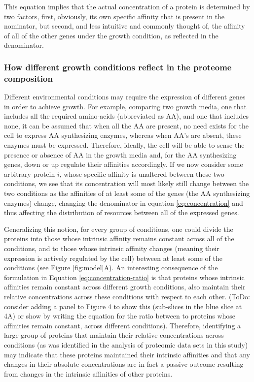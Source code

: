 \documentclass[notitlepage]{article}
\begin{document}
This equation implies that the actual concentration of a protein is determined by two factors, first, obviously, its own specific affinity that is present in the nominator, but second, and less intuitive and commonly thought of, the affinity of all of the other genes under the growth condition, as reflected in the denominator.

\subsubsection{How different growth conditions reflect in the proteome composition}
Different environmental conditions may require the expression of different genes in order to achieve growth.
For example, comparing two growth media, one that includes all the required amino-acids (abbreviated as AA), and one that includes none, it can be assumed that when all the AA are present, no need exists for the cell to express AA synthesizing enzymes, whereas when AA's are absent, these enzymes must be expressed.
Therefore, ideally, the cell will be able to sense the presence or absence of AA in the growth media and, for the AA synthesizing genes, down or up regulate their affinities accordingly.
If we now consider some arbitrary protein $i$, whose specific affinity is unaltered between these two conditions, we see that its concentration will most likely still change between the two conditions as the affinities of at least some of the genes (the AA synthesizing enzymes) change, changing the denominator in equation \ref{eq:concentration} and thus affecting the distribution of resources between all of the expressed genes.

Generalizing this notion, for every group of conditions, one could divide the proteins into those whose intrinsic affinity remains constant across all of the conditions, and to those whose intrinsic affinity changes (meaning their expression is actively regulated by the cell) between at least some of the conditions (see Figure \ref{fig:model}A).
An interesting consequence of the formulation in Equation \ref{eq:concentration-ratio} is that proteins whose intrinsic affinities remain constant across different growth conditions, also maintain their relative concentrations across these conditions with respect to each other.
(ToDo: consider adding a panel to Figure 4 to show this (sub-slices in the blue slice at 4A) or show by writing the equation for the ratio between to proteins whose affinities remain constant, across different conditions).
Therefore, identifying a large group of proteins that maintain their relative concentrations across conditions (as was identified in the analysis of proteomic data sets in this study) may indicate that these proteins maintained their intrinsic affinities and that any changes in their absolute concentrations are in fact a passive outcome resulting from changes in the intrinsic affinities of other proteins.
\end{document}

